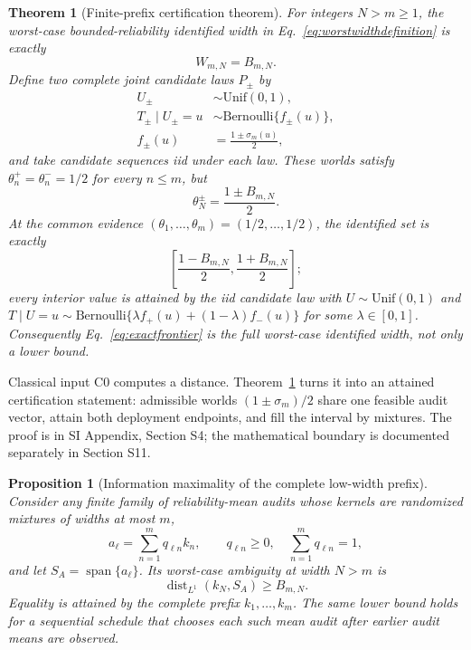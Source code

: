 \documentclass[10pt,twocolumn]{article}
\newtheorem{theorem}{Theorem}
\newtheorem{proposition}{Proposition}
\newcommand{\dist}{\operatorname{dist}}
\newcommand{\Span}{\operatorname{span}}
\begin{document}
\begin{theorem}[Finite-prefix certification theorem]
\label{thm:chebyshev}
For integers $N>m\ge1$, the worst-case bounded-reliability identified width in Eq.~\ref{eq:worstwidthdefinition} is exactly
\begin{equation}
W_{m,N}=B_{m,N}.
\label{eq:certificationwidth}
\end{equation}
Define two complete joint candidate laws $P_\pm$ by
\begin{equation}
\begin{aligned}
U_\pm&\sim\mathrm{Unif}(0,1),\\
T_\pm\mid U_\pm=u&\sim\mathrm{Bernoulli}\{f_\pm(u)\},\\
f_\pm(u)&=\frac{1\pm\sigma_m(u)}2,
\end{aligned}
\label{eq:blindworlds}
\end{equation}
and take candidate sequences iid under each law. These worlds satisfy $\theta_n^+=\theta_n^-=1/2$ for every $n\le m$, but
\begin{equation}
\theta_N^\pm=\frac{1\pm B_{m,N}}2.
\label{eq:exactseparation}
\end{equation}
At the common evidence $(\theta_1,\ldots,\theta_m)=(1/2,\ldots,1/2)$, the identified set is exactly
\begin{equation}
\left[\frac{1-B_{m,N}}2,\frac{1+B_{m,N}}2\right];
\label{eq:fullidentifiedset}
\end{equation}
every interior value is attained by the iid candidate law with $U\sim\mathrm{Unif}(0,1)$ and $T\mid U=u\sim\mathrm{Bernoulli}\{\lambda f_+(u)+(1-\lambda)f_-(u)\}$ for some $\lambda\in[0,1]$. Consequently Eq.~\ref{eq:exactfrontier} is the full worst-case identified width, not only a lower bound.
\end{theorem}

Classical input C0 computes a distance. Theorem~\ref{thm:chebyshev} turns it into an attained certification statement: admissible worlds $(1\pm\sigma_m)/2$ share one feasible audit vector, attain both deployment endpoints, and fill the interval by mixtures. The proof is in SI Appendix, Section S4; the mathematical boundary is documented separately in Section S11.

\begin{proposition}[Information maximality of the complete low-width prefix]
\label{prop:prefixoptimal}
Consider any finite family of reliability-mean audits whose kernels are randomized mixtures of widths at most $m$,
\begin{equation}
a_\ell=\sum_{n=1}^m q_{\ell n}k_n,
\qquad q_{\ell n}\ge0,
\quad \sum_{n=1}^m q_{\ell n}=1,
\label{eq:mixedaudit}
\end{equation}
and let $S_A=\Span\{a_\ell\}$. Its worst-case ambiguity at width $N>m$ is
\begin{equation}
\dist_{L^1}(k_N,S_A)\ge B_{m,N}.
\label{eq:auditoptimality}
\end{equation}
Equality is attained by the complete prefix $k_1,\ldots,k_m$. The same lower bound holds for a sequential schedule that chooses each such mean audit after earlier audit means are observed.
\end{proposition}
\end{document}
